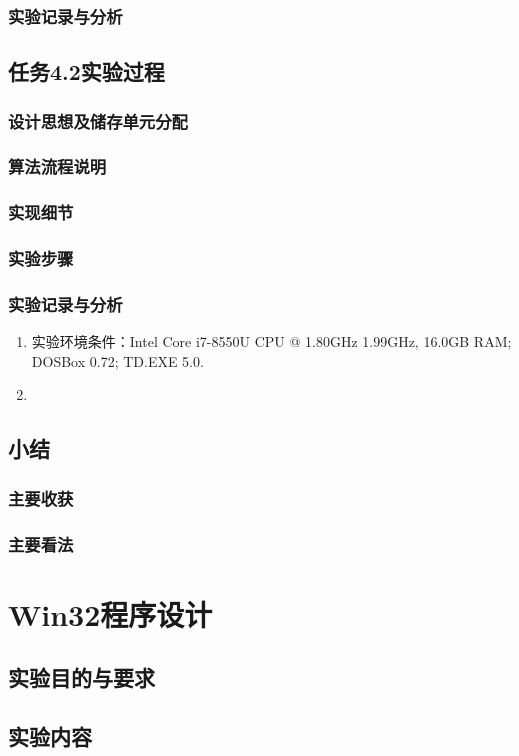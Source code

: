 \documentclass{ctexrep}
\begin{document}
\subsection{实验记录与分析}
\section{任务4.2实验过程}
\subsection{设计思想及储存单元分配}
\subsection{算法流程说明}
\subsection{实现细节}
\subsection{实验步骤}
\subsection{实验记录与分析}
\begin{enumerate}
    \item 实验环境条件：Intel Core i7-8550U CPU @ 1.80GHz 1.99GHz, 16.0GB RAM; DOSBox 0.72; TD.EXE 5.0.
    \item 
\end{enumerate}
\section{小结}
\subsection{主要收获}
\subsection{主要看法}


\chapter{Win32程序设计}
\section{实验目的与要求}
\section{实验内容}
\end{document}
